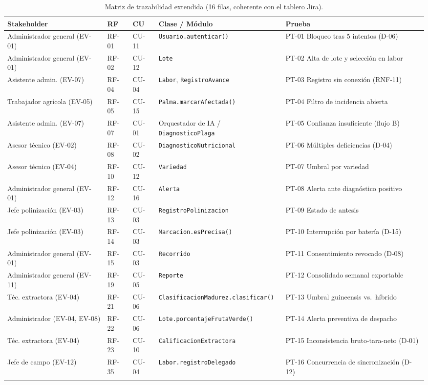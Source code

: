 \documentclass[11pt,a4paper]{article}
\begin{document}
\begin{longtable}{p{2.6cm}p{1.1cm}p{1.1cm}p{3.4cm}p{3.6cm}}
\toprule
\textbf{Stakeholder} & \textbf{RF} & \textbf{CU} & \textbf{Clase / Módulo} & \textbf{Prueba} \\
\midrule
\endhead
Administrador general (EV-01) & RF-01 & CU-11 & \texttt{Usuario.autenticar()} & PT-01 Bloqueo tras 5 intentos (D-06) \\
Administrador general (EV-01) & RF-02 & CU-12 & \texttt{Lote} & PT-02 Alta de lote y selección en labor \\
Asistente admin. (EV-07) & RF-04 & CU-04 & \texttt{Labor}, \texttt{RegistroAvance} & PT-03 Registro sin conexión (RNF-11) \\
Trabajador agrícola (EV-05) & RF-05 & CU-15 & \texttt{Palma.marcarAfectada()} & PT-04 Filtro de incidencia abierta \\
Asistente admin. (EV-07) & RF-07 & CU-01 & Orquestador de IA / \texttt{DiagnosticoPlaga} & PT-05 Confianza insuficiente (flujo B) \\
Asesor técnico (EV-02) & RF-08 & CU-02 & \texttt{DiagnosticoNutricional} & PT-06 Múltiples deficiencias (D-04) \\
Asesor técnico (EV-04) & RF-10 & CU-12 & \texttt{Variedad} & PT-07 Umbral por variedad \\
Administrador general (EV-01) & RF-12 & CU-16 & \texttt{Alerta} & PT-08 Alerta ante diagnóstico positivo \\
Jefe polinización (EV-03) & RF-13 & CU-03 & \texttt{RegistroPolinizacion} & PT-09 Estado de antesis \\
Jefe polinización (EV-03) & RF-14 & CU-03 & \texttt{Marcacion.esPrecisa()} & PT-10 Interrupción por batería (D-15) \\
Administrador general (EV-01) & RF-15 & CU-03 & \texttt{Recorrido} & PT-11 Consentimiento revocado (D-08) \\
Administrador general (EV-11) & RF-19 & CU-05 & \texttt{Reporte} & PT-12 Consolidado semanal exportable \\
Téc. extractora (EV-04) & RF-21 & CU-06 & \texttt{ClasificacionMadurez.clasificar()} & PT-13 Umbral guineensis vs.\ híbrido \\
Administrador (EV-04, EV-08) & RF-22 & CU-06 & \texttt{Lote.porcentajeFrutaVerde()} & PT-14 Alerta preventiva de despacho \\
Téc. extractora (EV-04) & RF-23 & CU-10 & \texttt{CalificacionExtractora} & PT-15 Inconsistencia bruto-tara-neto (D-01) \\
Jefe de campo (EV-12) & RF-35 & CU-04 & \texttt{Labor.registroDelegado} & PT-16 Concurrencia de sincronización (D-12) \\
\bottomrule
\caption{Matriz de trazabilidad extendida (16 filas, coherente con el tablero Jira).}
\label{tab:matriz-case}
\end{longtable}
\end{document}
